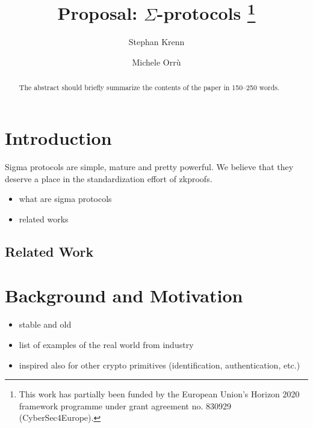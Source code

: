 \documentclass[runningheads]{llncs}
\begin{document}
\title{Proposal: $\Sigma$-protocols%
\thanks{This work has partially been funded by the European Union's Horizon 2020 framework programme under grant agreement no. 830929 (CyberSec4Europe).}}
%

\author{Stephan Krenn\and
        Michele Orr\`u}


%
\maketitle              %
%
\begin{abstract}
The abstract should briefly summarize the contents of the paper in
150--250 words.

\end{abstract}

\section{Introduction}


Sigma protocols are simple, mature and pretty powerful. We believe that they deserve a place in the standardization effort of zkproofs.
\begin{itemize}
  \item what are sigma protocols
  \item related works
\end{itemize}

\subsection{Related Work}

\section{Background and Motivation}

\begin{itemize}
\item stable and old
\item list of examples of the real world from industry
\item inspired also for other crypto primitives (identification, authentication, etc.)
\end{itemize}
\end{document}
